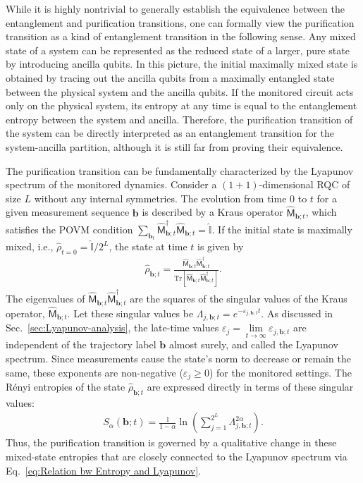 \documentclass[preprint,pteplogo]{ptephy_v2}%
\numberwithin{equation}{section}
\theoremstyle{definition}
\newcommand{\mr}[1]{\mathrm{#1}}
\newcommand{\Tr}{\mr{Tr}}
\begin{document}
While it is highly nontrivial to generally establish the equivalence between the entanglement and purification transitions, one can formally view the purification transition as a kind of entanglement transition in the following sense.
Any mixed state of a system can be represented as the reduced state of a larger, pure state by introducing ancilla qubits.
In this picture, the initial maximally mixed state is obtained by tracing out the ancilla qubits from a maximally entangled state between the physical system and the ancilla qubits.
If the monitored circuit acts only on the physical system, its entropy at any time is equal to the entanglement entropy between the system and ancilla.
Therefore, the purification transition of the system can be directly interpreted as an entanglement transition for the system-ancilla partition, although it is still far from proving their equivalence.

The purification transition can be fundamentally characterized by the Lyapunov spectrum of the monitored dynamics.
Consider a $(1+1)$-dimensional RQC of size $L$ without any internal symmetries.
The evolution from time $0$ to $t$ for a given measurement sequence $\bm{b}$ is described by a Kraus operator $\hat{\mathsf{M}}_{\bm{b};t}$, which satisfies the POVM condition $\sum_{\bm{b}_t} \hat{\mathsf{M}}_{\bm{b};t}^\dagger \hat{\mathsf{M}}_{\bm{b};t}  = \hat{\mathbb{I}}$.
If the initial state is maximally mixed, i.e., $\hat{\rho}_{t=0} = \hat{\mathbb{I}}/2^L$, the state at time $t$ is given by
\begin{align}
    \hat{\rho}_{\bm{b};t} = \frac{\hat{\mathsf{M}}_{\bm{b};t} \hat{\mathsf{M}}^\dagger_{\bm{b};t}}{\Tr [\hat{\mathsf{M}}_{\bm{b};t} \hat{\mathsf{M}}^\dagger_{\bm{b};t}]}.
    \label{eq:evolved state from I}
\end{align}
The eigenvalues of $\hat{\mathsf{M}}_{\bm{b};t} \hat{\mathsf{M}}^\dagger_{\bm{b};t}$ are the squares of the singular values of the Kraus operator, $\hat{\mathsf{M}}_{\bm{b};t}$.
Let these singular values be $\Lambda_{j, \bm{b};t} = e^{-\varepsilon_{j, \bm{b};t}t}$.
As discussed in Sec.~\ref{sec:Lyapunov-analysis}, the late-time values $\varepsilon_j=\underset{t\to\infty}{\lim}\varepsilon_{j,\bm{b};t}$ are independent of the trajectory label $\bm{b}$ almost surely, and called the Lyapunov spectrum.
Since measurements cause the state's norm to decrease or remain the same, these exponents are non-negative ($\varepsilon_j\geq0$) for the monitored settings.
The R\'enyi entropies of the state $\hat{\rho}_{\bm{b};t}$ are expressed directly in terms of these singular values:
\begin{align}
    S_\alpha(\bm{b};\!t) = \frac{1}{1-\alpha}\ln\left(\sum_{j=1}^{2^L} \Lambda_{j,\bm{b};t}^{2\alpha}\right).
    \label{eq:Relation bw Entropy and Lyapunov}
\end{align}
Thus, the purification transition is governed by a qualitative change in these mixed-state entropies that are closely connected to the Lyapunov spectrum via Eq.~\eqref{eq:Relation bw Entropy and Lyapunov}.
\end{document}
